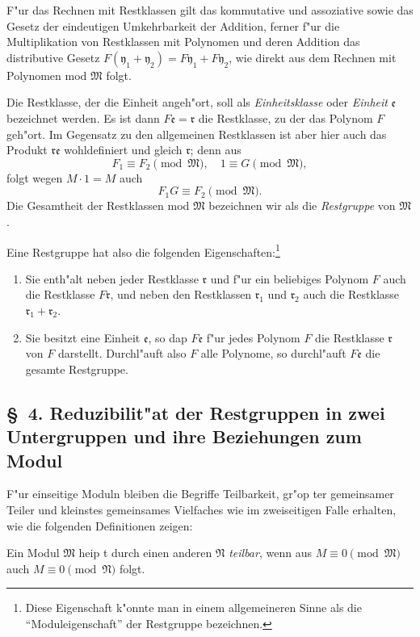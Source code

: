 \documentclass[12pt,a4paper]{article}
\begin{document}
F"ur das Rechnen mit Restklassen gilt das kommutative und assoziative sowie das Gesetz der eindeutigen Umkehrbarkeit der Addition, ferner f"ur die Multiplikation von Restklassen mit Polynomen und deren Addition das distributive Gesetz $F(\mathfrak{y}_1 + \mathfrak{y}_2) = F\mathfrak{y}_1 + F\mathfrak{y}_2$, wie direkt aus dem Rechnen mit Polynomen mod $\mathfrak{M}$ folgt.

Die Restklasse, der die Einheit angeh"ort, soll als \emph{Einheitsklasse} oder \emph{Einheit} $\mathfrak{e}$ bezeichnet werden. Es ist dann $F\mathfrak{e} = \mathfrak{r}$ die Restklasse, zu der das Polynom $F$ geh"ort. Im Gegensatz zu den allgemeinen Restklassen ist aber hier auch das Produkt $\mathfrak{r}\mathfrak{e}$ wohldefiniert und gleich $\mathfrak{r}$; denn aus
\[
F_1 \equiv F_2 \pmod{\mathfrak{M}}, \quad 1 \equiv G \pmod{\mathfrak{M}},
\]
folgt wegen $M \cdot 1 = M$ auch
\[
F_1 G \equiv F_2 \pmod{\mathfrak{M}}.
\]
Die Gesamtheit der Restklassen mod $\mathfrak{M}$ bezeichnen wir als die \emph{Restgruppe} von $\mathfrak{M}$.

Eine Restgruppe hat also die folgenden Eigenschaften:\footnote{Diese Eigenschaft k"onnte man in einem allgemeineren Sinne als die ``Moduleigenschaft'' der Restgruppe bezeichnen.}

\begin{enumerate}
\item Sie enth"alt neben jeder Restklasse $\mathfrak{r}$ und f"ur ein beliebiges Polynom $F$ auch die Restklasse $F\mathfrak{r}$, und neben den Restklassen $\mathfrak{r}_1$ und $\mathfrak{r}_2$ auch die Restklasse $\mathfrak{r}_1 + \mathfrak{r}_2$.
\item Sie besitzt eine Einheit $\mathfrak{e}$, so dap $F\mathfrak{e}$ f"ur jedes Polynom $F$ die Restklasse $\mathfrak{r}$ von $F$ darstellt. Durchl"auft also $F$ alle Polynome, so durchl"auft $F\mathfrak{e}$ die gesamte Restgruppe.
\end{enumerate}

\subsection*{\S\ 4. Reduzibilit"at der Restgruppen in zwei Untergruppen und ihre Beziehungen zum Modul}

F"ur einseitige Moduln bleiben die Begriffe Teilbarkeit, gr"op ter gemeinsamer Teiler und kleinstes gemeinsames Vielfaches wie im zweiseitigen Falle erhalten, wie die folgenden Definitionen zeigen:

Ein Modul $\mathfrak{M}$ heip t durch einen anderen $\mathfrak{N}$ \emph{teilbar}, wenn aus $M \equiv 0 \pmod{\mathfrak{M}}$ auch $M \equiv 0 \pmod{\mathfrak{N}}$ folgt.
\end{document}

